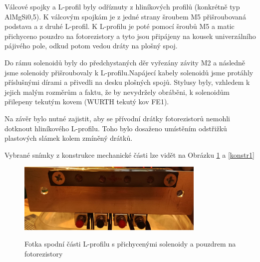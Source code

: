 \documentclass[12pt,oneside]{book} %
\begin{document}
\qquad Válcové spojky a L-profil byly odříznuty z hliníkových profilů (konkrétně typ AlMgSi0,5). K válcovým spojkám je z jedné strany šroubem M5 přišroubovaná podstava a z druhé L-profil. K L-profilu je poté pomocí šroubů M5 a matic přichyceno pouzdro na fotorezistory a tyto jsou připájeny na kousek univerzálního pájivého pole, odkud potom vedou dráty na plošný spoj. 

\qquad Do rámu solenoidů byly do předchystaných děr vyřezány závity M2 a následně jsme solenoidy přišroubovaly k L-profilu.Napájecí kabely solenoidů jsme protáhly příslušnými dírami a přivedli na desku plošných spojů. Stylusy byly, vzhledem k jejich malým rozměrům a faktu, že by nevydržely obráběni, k solenoidům přilepeny tekutým kovem (WURTH tekutý kov FE1).

\qquad Na závěr bylo nutné zajistit, aby se přívodní drátky fotorezistorů nemohli dotknout hliníkového L-profilu. Toho bylo dosaženo umístěním odstřižků plastových slámek kolem zmíněný drátků. 

\qquad Vybrané snímky z konstrukce mechanické části lze vidět na Obrázku \ref{konstr0} a \ref{konstr1}

\begin{figure}[h] \large\centering
\includegraphics[width=0.80\textwidth]{./img/konstr0.png}\\[1cm] 
\caption{Fotka spodní části L-profilu s přichycenými solenoidy a pouzdrem na fotorezistory}
\label{konstr0}
\end{figure} 
\end{document}
